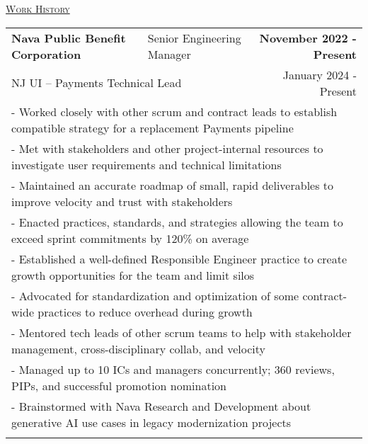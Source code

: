 \documentclass[letterpaper]{article}
\begin{document}
	\begin{center}
		\vspace{0.0in}
		\underline{\large \scshape Work History}
		\begin{tabular}{p{}p{}r}
			  \textbf{Nava Public Benefit Corporation} &
			  \quad\quad\quad Senior Engineering Manager &
			  \textbf{November 2022 - Present\quad}

			  \\
			  \multicolumn{2}{p{0.5\textwidth}}{\quad NJ UI -- Payments Technical Lead}
			  &
			  {January 2024 - Present \quad\quad\quad\quad}
		  \\
			  \multicolumn{3}{p{\textwidth}}{\quad\quad - Worked closely with other scrum and contract leads to establish compatible strategy for a replacement Payments pipeline} \\
			  \multicolumn{3}{p{\textwidth}}{\quad\quad - Met with stakeholders and other project-internal resources to investigate user requirements and technical limitations} \\
			  \multicolumn{3}{p{\textwidth}}{\quad\quad - Maintained an accurate roadmap of small, rapid deliverables to improve velocity and trust with stakeholders} \\
			  \multicolumn{3}{p{\textwidth}}{\quad\quad - Enacted practices, standards, and strategies allowing the team to exceed sprint commitments by 120\% on average  } \\
			  \multicolumn{3}{p{\textwidth}}{\quad\quad - Established a well-defined Responsible Engineer practice to create growth opportunities for the team and limit silos} \\
			  \multicolumn{3}{p{\textwidth}}{\quad\quad - Advocated for standardization and optimization of some contract-wide practices to reduce overhead during growth} \\
			  \multicolumn{3}{p{\textwidth}}{\quad\quad - Mentored tech leads of other scrum teams to help with stakeholder management, cross-disciplinary collab, and velocity } \\
			  \multicolumn{3}{p{\textwidth}}{\quad\quad - Managed up to 10 ICs and managers concurrently; 360 reviews, PIPs, and successful promotion nomination } \\
			  \multicolumn{3}{p{\textwidth}}{\quad\quad - Brainstormed with Nava Research and Development about generative AI use cases in legacy modernization projects} 
		  \\
		  \\

\end{tabular}
\end{center}
\end{document}
